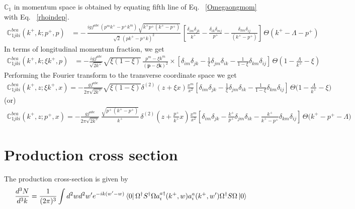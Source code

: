 \documentclass[aps,prd,amsmath,amssymb,nofootinbib]{revtex4-2}
\def\mf#1{\mathbb{#1}}
\def\v#1{\mathbf{#1}}
\numberwithin{equation}{section}
\begin{document}
$\mf{C}_{1}$ in momentum space is obtained by equating fifth line of Eq.~ \eqref{Omegaongmom} with Eq.~ \eqref{rhoindep}. 
\begin{align}
    \mf{C}^{bca}_{1jki}(k^{+},k; p^{+},p) & = -\,\frac{igf^{abc}\, \left(p^{m}k^{+}-p^{+}k^{m}\right)\,\sqrt{k^{+}p^{+}(k^{+}-p^{+})}}{\sqrt{2}\,\left(pk^{+}-p^{+}k\right)^{2}}\,\left[\frac{\delta_{im}\delta_{jk}}{k^{+}}-\frac{\delta_{ik}\delta_{mj}}{p^{+}}-\frac{\delta_{km}\delta_{ij}}{(k^{+}-p^{+})}\right]\,\Theta\left(k^{+}-\Lambda-p^{+}\right) 
\end{align}
In terms of longitudinal momentum fraction, we get
\begin{align}
  \mf{C}^{bca}_{1jki}(k^{+}, k; \xi k^{+}, p) & = -\frac{ i g f^{abc}} {\sqrt{2 k^+}} 
    \sqrt{\xi (1-\xi)}\,  
   \frac{p^m - \xi k^m  }{( \v{p}- \xi \v{k} )^2 } \times
   \left[ \delta_{im} \delta_{jk}
     - \frac{1}{\xi}\delta_{jm} \delta_{ik}
   - \frac{1}{1-\xi} \delta_{km}\delta_{ij}
 \right]\, \Theta\left(1-\frac{\Lambda}{k^{+}}-\xi\right)
\end{align}
Performing the Fourier transform to the transverse coordinate space we get
\begin{align}
   \mf{C}^{bca}_{1jki}(k^{+},z; \xi k^{+},x) = -\frac{gf^{abc}}{2\pi \sqrt{2k^{+}}}\sqrt{\xi(1-\xi)} \delta^{(2)}(z+\xi x)\frac{x^{m}}{x^{2}}\left[ \delta_{im} \delta_{jk}
     - \frac{1}{\xi}\delta_{jm} \delta_{ik}
   - \frac{1}{1-\xi} \delta_{km}\delta_{ij}
 \right]\,\Theta\bigg(1-\frac{\Lambda}{k^{+}}-\xi\bigg)
\end{align}
(or)
\begin{align}
   \mf{C}^{bca}_{1jki}(k^{+},z; p^{+},x) = -\frac{gf^{abc}}{2\pi \sqrt{2k^{+}}}\,\frac{\sqrt{p^{+}\,(k^{+}-p^{+})}}{k^{+}}\, \delta^{(2)}\left(z+\frac{p^{+}}{k^{+}} x\right)\frac{x^{m}}{x^{2}}\left[ \delta_{im} \delta_{jk}
     - \frac{k^{+}}{p^{+}}\delta_{jm} \delta_{ik}
   - \frac{k^{+}}{k^{+}-p^{+}} \delta_{km}\delta_{ij}
 \right]\,\Theta\bigg(k^{+}-p^{+}-\Lambda\bigg)
\end{align}


\section{Production cross section}

The production cross-section is given by 
\begin{equation}
\frac{d^3  N}{d^3 k} = \frac{1}{(2\pi)^{3}} \int d^{2}w d^{2} w^\prime 
e^{-ik (w^{\prime}-w)}
\bra{0}\Omega^{\dagger} S^{\dagger}\Omega a^{a\dagger}_{i}(k^{+},w) 
a^{a}_{i} (k^{+} , w^\prime) \Omega^{\dagger} S\Omega\ket{0}
\end{equation}
\end{document}
